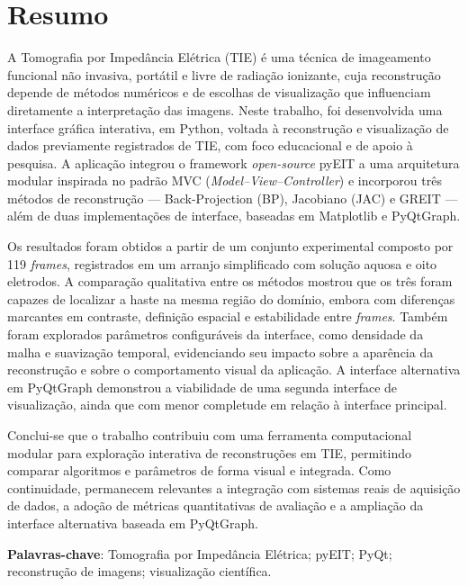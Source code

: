 
\chapter*{Resumo}

A Tomografia por Impedância Elétrica (TIE) é uma técnica de imageamento funcional não invasiva, portátil e livre de radiação ionizante, cuja reconstrução depende de métodos numéricos e de escolhas de visualização que influenciam diretamente a interpretação das imagens. Neste trabalho, foi desenvolvida uma interface gráfica interativa, em Python, voltada à reconstrução e visualização de dados previamente registrados de TIE, com foco educacional e de apoio à pesquisa. A aplicação integrou o framework \textit{open-source} pyEIT a uma arquitetura modular inspirada no padrão MVC (\textit{Model--View--Controller}) e incorporou três métodos de reconstrução --- Back-Projection (BP), Jacobiano (JAC) e GREIT --- além de duas implementações de interface, baseadas em Matplotlib e PyQtGraph.

Os resultados foram obtidos a partir de um conjunto experimental composto por 119 \textit{frames}, registrados em um arranjo simplificado com solução aquosa e oito eletrodos. A comparação qualitativa entre os métodos mostrou que os três foram capazes de localizar a haste na mesma região do domínio, embora com diferenças marcantes em contraste, definição espacial e estabilidade entre \textit{frames}. Também foram explorados parâmetros configuráveis da interface, como densidade da malha e suavização temporal, evidenciando seu impacto sobre a aparência da reconstrução e sobre o comportamento visual da aplicação. A interface alternativa em PyQtGraph demonstrou a viabilidade de uma segunda interface de visualização, ainda que com menor completude em relação à interface principal.

Conclui-se que o trabalho contribuiu com uma ferramenta computacional modular para exploração interativa de reconstruções em TIE, permitindo comparar algoritmos e parâmetros de forma visual e integrada. Como continuidade, permanecem relevantes a integração com sistemas reais de aquisição de dados, a adoção de métricas quantitativas de avaliação e a ampliação da interface alternativa baseada em PyQtGraph.

\textbf{Palavras-chave}: Tomografia por Impedância Elétrica; pyEIT; PyQt; reconstrução de imagens; visualização científica.